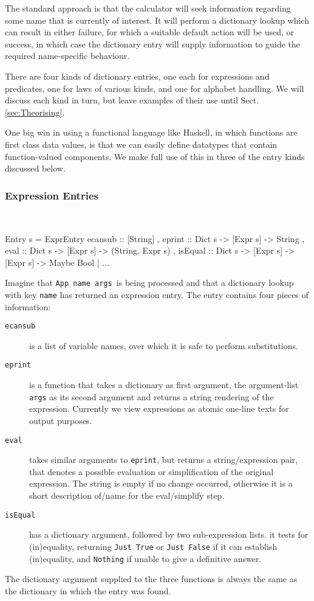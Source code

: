 The standard approach is that the calculator
will seek information regarding some name that is
currently of interest.
It will perform a dictionary lookup which can result
in either failure, for which a suitable default action will be used,
or success, in which case the dictionary entry will supply
information to guide the required name-specific behaviour.

There are four kinds of dictionary entries,
one each for expressions and predicates,
one for laws of various kinds,
and one for alphabet handling.
We will discuss each kind in turn,
but leave examples of their use until Sect.\ref{sec:Theorising}.

One big win in using a functional language like Haskell,
in which functions are first class data values,
is that we can easily define datatypes that
contain function-valued components.
We make full use of this in three of the entry kinds discussed below.


\subsubsection{Expression Entries}~

\begin{code}
Entry s
  = ExprEntry
    { ecansub :: [String]
    , eprint :: Dict s -> [Expr s] -> String
    , eval :: Dict s -> [Expr s] -> (String, Expr s)
    , isEqual :: Dict s -> [Expr s] -> [Expr s] -> Maybe Bool}
  | ...
\end{code}
Imagine that \texttt{App name args }is being processed
and that a dictionary lookup with key \texttt{name}
has returned an expression entry.
The entry contains four pieces of information:
\begin{description}
  \item[\texttt{ecansub}]
     is a list of variable names,
      over which it is safe to perform substitutions.
  \item[\texttt{eprint}]
    is a function that takes a dictionary as first argument,
    the argument-list \texttt{args} as its second argument
    and returns a string rendering of the expression.
    Currently we view expressions as atomic one-line texts
    for output purposes.
  \item[\texttt{eval}]
    takes similar arguments to \texttt{eprint},
    but returns a string/expression pair,
    that denotes a possible evaluation or simplification
    of the original expression.
    The string is empty if no change occurred,
    otherwise it is a short description of/name for the eval/simplify step.
  \item[\texttt{isEqual}]
    has a dictionary argument, followed by two sub-expression lists.
    it tests for (in)equality, returning \texttt{Just True} or \texttt{Just False}
    if it can establish (in)equality,
    and \texttt{Nothing} if unable to give a definitive answer.
\end{description}
The dictionary argument supplied to the three functions
is always the same as the dictionary in which the entry was found.

